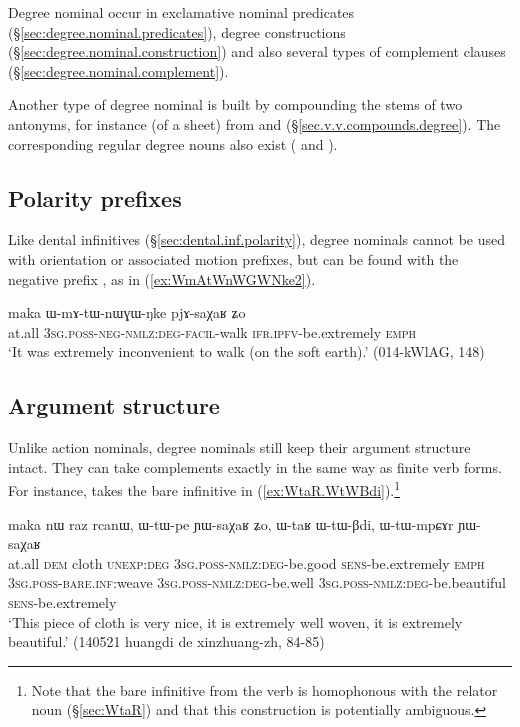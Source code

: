Degree nominal occur in exclamative nominal predicates (§\ref{sec:degree.nominal.predicates}), degree constructions (§\ref{sec:degree.nominal.construction}) and also several types of complement clauses (§\ref{sec:degree.nominal.complement}).


Another type of degree nominal is built by compounding the stems of two antonyms, for instance  (of a sheet) from  and  (§\ref{sec.v.v.compounds.degree}). The corresponding regular degree nouns also exist ( and ).

\subsection{Polarity prefixes} \label{sec:degree.nominal.prefixes}
Like dental infinitives (§\ref{sec:dental.inf.polarity}), degree nominals cannot be used with orientation or associated motion prefixes, but can be found with the negative prefix , as in (\ref{ex:WmAtWnWGWNke2}).

 \begin{exe}
\ex \label{ex:WmAtWnWGWNke2}
\gll  maka ɯ-mɤ-tɯ-nɯɣɯ-ŋke pjɤ-saχaʁ ʑo \\
at.all \textsc{3sg}.\textsc{poss}-\textsc{neg}-\textsc{nmlz}:\textsc{deg}-\textsc{facil}-walk \textsc{ifr}.\textsc{ipfv}-be.extremely \textsc{emph} \\
\glt `It was extremely inconvenient to walk (on the soft earth).' (014-kWlAG, 148)
\end{exe}


\subsection{Argument structure} \label{sec:degree.nominal.arguments}
Unlike action nominals, degree nominals still keep their argument structure intact. They can take complements exactly in the same way as finite verb forms. For instance,  takes the bare infinitive  in (\ref{ex:WtaR.WtWBdi}).\footnote{Note that the bare infinitive  from the verb  is homophonous with the relator noun  (§\ref{sec:WtaR}) and that this construction is potentially ambiguous. }

\begin{exe}
\ex \label{ex:WtaR.WtWBdi}
\gll maka nɯ raz rcanɯ, ɯ-tɯ-pe ɲɯ-saχaʁ ʑo, ɯ-taʁ ɯ-tɯ-βdi, ɯ-tɯ-mpɕɤr ɲɯ-saχaʁ \\
at.all \textsc{dem} cloth \textsc{unexp}:\textsc{deg}  \textsc{3sg}.\textsc{poss}-\textsc{nmlz}:\textsc{deg}-be.good \textsc{sens}-be.extremely \textsc{emph} \textsc{3sg}.\textsc{poss}-\textsc{bare}.\textsc{inf}:weave  \textsc{3sg}.\textsc{poss}-\textsc{nmlz}:\textsc{deg}-be.well \textsc{3sg}.\textsc{poss}-\textsc{nmlz}:\textsc{deg}-be.beautiful \textsc{sens}-be.extremely \\
\glt `This piece of cloth is very nice, it is extremely well woven, it is extremely beautiful.' (140521 huangdi de xinzhuang-zh, 84-85)
\end{exe}

